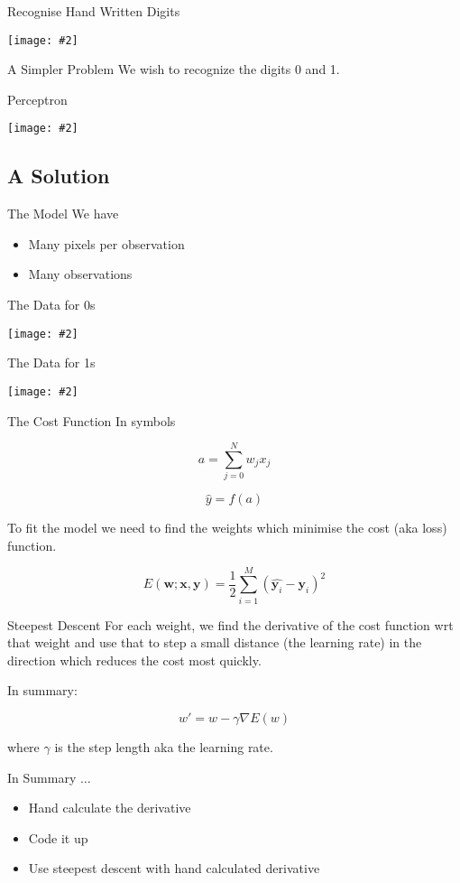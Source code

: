 \documentclass{beamer}
\newcommand {\framedgraphic}[2] {
    \begin{frame}{#1}
        \begin{center}
            \texttt{[image: \#2]}
        \end{center}
    \end{frame}
}
\begin{document}
\framedgraphic{Recognise Hand Written Digits}{diagrams/mnist_originals.png}

\begin{frame}[fragile]{A Simpler Problem}
We wish to recognize the digits 0 and 1.
\end{frame}

\framedgraphic{Perceptron}{diagrams/Fita3.png}

\subsection{A Solution}

\begin{frame}[fragile]{The Model}
We have
\begin{itemize}
\item Many pixels per observation
\item Many observations
\end{itemize}
\end{frame}

\framedgraphic{The Data for 0s}{diagrams/mnist_train0.jpg}

\framedgraphic{The Data for 1s}{diagrams/mnist_train1.jpg}

\begin{frame}[fragile]{The Cost Function}
In symbols

$$
a = \sum_{j=0}^{N} w_{j} x_j
$$

$$
\hat{y} = f(a)
$$

To fit the model we need to find the weights which minimise the cost
(aka loss) function.

$$
E(\boldsymbol{w}; \boldsymbol{x}, \boldsymbol{y}) =
\frac{1}{2}\sum_{i=1}^M(\hat{\boldsymbol{y}_i} - \boldsymbol{y}_i)^2
$$
\end{frame}

\begin{frame}[fragile]{Steepest Descent}
For each weight, we find the derivative of the cost function wrt that
weight and use that to step a small distance (the learning rate) in
the direction which reduces the cost most quickly.

In summary:

$$
w' = w - \gamma\nabla E(w)
$$

where $\gamma$ is the step length aka the learning rate.
\end{frame}

\begin{frame}[fragile]{In Summary $\ldots$}
\begin{itemize}
\item Hand calculate the derivative
\item Code it up
\item Use steepest descent with hand calculated derivative
\end{itemize}
\end{frame}
\end{document}
